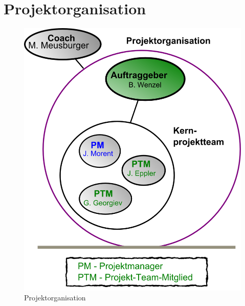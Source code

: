 \section{Projektorganisation}
\begin{figure}[!ht]
\includegraphics[width=\textwidth, height=\textheight, keepaspectratio, angle=0]{images/projektorganisation}
\caption{Projektorganisation}
\end{figure}
